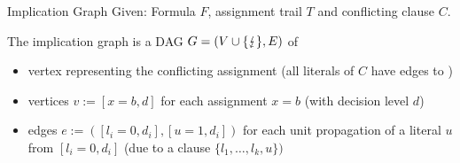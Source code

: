 \documentclass[t]{sdqbeamer}
\begin{document}
\begin{frame}{Implication Graph}
Given: Formula $F$, assignment trail $T$ and conflicting clause $C$.

The implication graph is a DAG $G=(V \cup \{ \text{\ensuremath{\lightning}} \},E)$ of 
\begin{itemize}
	\item vertex \blitz representing the conflicting assignment (all literals of $C$ have edges to \blitz)
	\item vertices $v := [x=b,d]$ for each assignment $x=b$ (with decision level $d$)
	\item edges $e := ([l_i=0, d_i], [u=1, d_i])$ for each unit propagation of a literal $u$ from $[l_i=0, d_i]$ (due to a clause $\{ l_1,\dots, l_k, u \})$
\end{itemize}
\end{frame}
\end{document}
